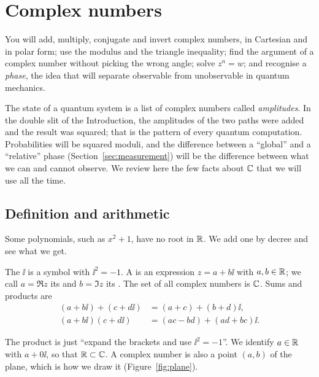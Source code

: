 \section{Complex numbers}\label{sec:complex}

\begin{objectives}
  You will add, multiply, conjugate and invert complex numbers, in Cartesian and in polar form; use the modulus and the triangle inequality; find the argument of a complex number without picking the wrong angle; solve $z^n=w$; and recognise a \emph{phase}, the idea that will separate observable from unobservable in quantum mechanics.
\end{objectives}

The state of a quantum system is a list of complex numbers called \emph{amplitudes}. In the double slit of the Introduction, the amplitudes of the two paths were added and the result was squared; that is the pattern of every quantum computation. Probabilities will be squared moduli, and the difference between a ``global'' and a ``relative'' phase (Section~\ref{sec:measurement}) will be the difference between what we can and cannot observe. We review here the few facts about $\mathbb{C}$ that we will use all the time.

\subsection{Definition and arithmetic}

Some polynomials, such as $x^2+1$, have no root in $\mathbb{R}$. We add one by decree and see what we get.

\begin{definition}\label{def:complex}
  The  $\ii$ is a symbol with $\ii^2=-1$. A  is an expression $z=a+b\ii$ with $a,b\in\mathbb{R}$; we call $a=\Re z$ its  and $b=\Im z$ its . The set of all complex numbers is $\mathbb{C}$. Sums and products are
  \begin{align*}
    (a+b\ii)+(c+d\ii) &= (a+c)+(b+d)\ii,\\
    (a+b\ii)(c+d\ii) &= (ac-bd)+(ad+bc)\ii .
  \end{align*}
\end{definition}

The product is just ``expand the brackets and use $\ii^2=-1$''. We identify $a\in\mathbb{R}$ with $a+0\ii$, so that $\mathbb{R}\subset\mathbb{C}$. A complex number is also a point $(a,b)$ of the plane, which is how we draw it (Figure~\ref{fig:plane}).

